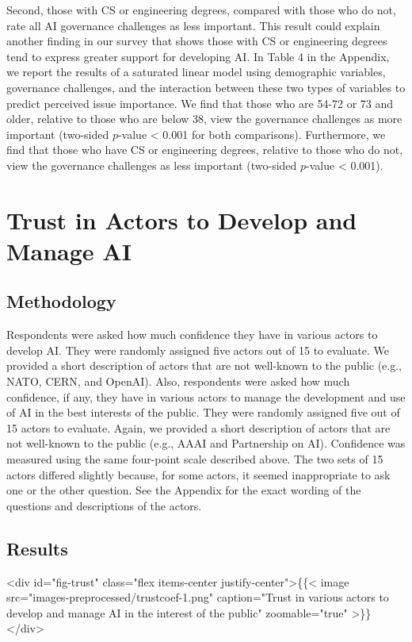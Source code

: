 \documentclass{article}
\begin{document}
Second, those with CS or engineering degrees, compared with those who do not, rate all AI governance challenges as less important. This result could explain another finding in our survey that shows those with CS or engineering degrees tend to express greater support for developing AI. In Table 4 in the Appendix, we report the results of a saturated linear model using demographic variables, governance challenges, and the interaction between these two types of variables to predict perceived issue importance. We find that those who are 54-72 or 73 and older, relative to those who are below 38, view the governance challenges as more important (two-sided \(p\)-value \textless{} 0.001 for both comparisons). Furthermore, we find that those who have CS or engineering degrees, relative to those who do not, view the governance challenges as less important (two-sided \(p\)-value \textless{} 0.001).

\section{Trust in Actors to Develop and Manage AI}

\subsection{Methodology}

Respondents were asked how much confidence they have in various actors to develop AI. They were randomly assigned five actors out of 15 to evaluate. We provided a short description of actors that are not well-known to the public (e.g., NATO, CERN, and OpenAI). Also, respondents were asked how much confidence, if any, they have in various actors to manage the development and use of AI in the best interests of the public. They were randomly assigned five out of 15 actors to evaluate. Again, we provided a short description of actors that are not well-known to the public (e.g., AAAI and Partnership on AI). Confidence was measured using the same four-point scale described above. The two sets of 15 actors differed slightly because, for some actors, it seemed inappropriate to ask one or the other question. See the Appendix for the exact wording of the questions and descriptions of the actors.

\subsection{Results}

<div id="fig-trust" class="flex items-center justify-center">\{\{< image src="images-preprocessed/trustcoef-1.png" caption="Trust in various actors to develop and manage AI in the interest of the public" zoomable="true" >\}\}</div>
\end{document}
